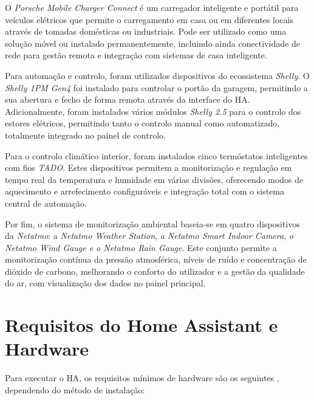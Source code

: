 O \textit{Porsche Mobile Charger Connect} é um carregador inteligente e portátil para veículos elétricos que permite o carregamento em casa ou em diferentes locais através de tomadas domésticas ou industriais. Pode ser utilizado como uma solução móvel ou instalado permanentemente, incluindo ainda conectividade de rede para gestão remota e integração com sistemas de casa inteligente.

Para automação e controlo, foram utilizados dispositivos do ecossistema \textit{Shelly}. O \textit{Shelly 1PM Gen4} foi instalado para controlar o portão da garagem, permitindo a sua abertura e fecho de forma remota através da interface do \gls{HA}. Adicionalmente, foram instalados vários módulos \textit{Shelly 2.5} para o controlo dos estores elétricos, permitindo tanto o controlo manual como automatizado, totalmente integrado no painel de controlo.

Para o controlo climático interior, foram instalados cinco termóstatos inteligentes com fios \textit{TADO}. Estes dispositivos permitem a monitorização e regulação em tempo real da temperatura e humidade em várias divisões, oferecendo modos de aquecimento e arrefecimento configuráveis e integração total com o sistema central de automação.

Por fim, o sistema de monitorização ambiental baseia-se em quatro dispositivos da \textit{Netatmo}: a \textit{Netatmo Weather Station}, \textit{a Netatmo Smart Indoor Camera}, \textit{o Netatmo Wind Gauge e o Netatmo Rain Gauge}. Este conjunto permite a monitorização contínua da pressão atmosférica, níveis de ruído e concentração de dióxido de carbono, melhorando o conforto do utilizador e a gestão da qualidade do ar, com visualização dos dados no painel principal.



\section{Requisitos do Home Assistant e Hardware}

Para executar o \gls{HA}, os requisitos mínimos de hardware são os seguintes , dependendo do método de instalação:

